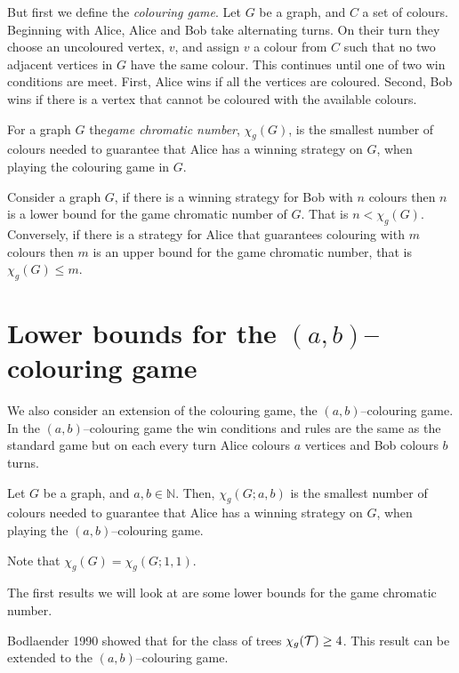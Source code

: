 But first we define the \textit{colouring game}. Let $G$ be a graph, and $C$ a set of colours. Beginning with Alice, Alice and Bob take alternating turns. On their turn they choose an uncoloured vertex, $v$, and assign $v$ a colour from $C$ such that no two adjacent vertices in $G$ have the same colour. This continues until one of two win conditions are meet. First, Alice wins if all the vertices are coloured. Second, Bob wins if there is a vertex that cannot be coloured with the available colours.


\begin{definition}
    For a graph $G$ the\textit{game chromatic number}, $\chi_g(G)$, is the smallest number of colours needed to guarantee that Alice has a winning strategy on $G$, when playing the colouring game in $G$.     
\end{definition}

Consider a graph $G$, if there is a winning strategy for Bob with $n$ colours then $n$ is a lower bound for the game chromatic number of $G$. That is $n<\chi_g(G)$. Conversely, if there is a strategy for Alice that guarantees colouring with $m$ colours then $m$ is an upper bound for the game chromatic number, that is $\chi_g(G)\leq m$.

\section{Lower bounds for the $(a,b)$--colouring game}


We also consider an extension of the colouring game, the $(a,b)$--colouring game. In the $(a,b)$--colouring game the win conditions and rules are the same as the standard game but on each every turn Alice colours $a$ vertices and Bob colours $b$ turns.
\begin{definition}
    Let $G$ be a graph, and $a,b\in\mathbb{N}$. 
    Then, $\chi_g(G;a,b)$ is the smallest number of colours needed to guarantee that Alice has a winning strategy on $G$, when playing the $(a,b)$--colouring game. 
\end{definition}
Note that $\chi_g(G) = \chi_g(G;1,1)$.

The first results we will look at are some lower bounds for the game chromatic number.

Bodlaender 1990 \cite{bodlander1990} showed that for the class of trees $\chi_g(\mathcal{T}) \geq 4$. This result can be extended to the $(a,b)$--colouring game.

